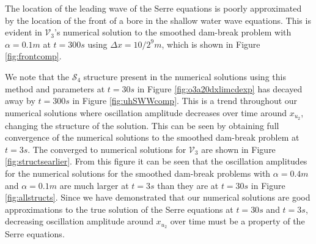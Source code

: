\documentclass[times]{elsarticle}
\begin{document}
The location of the leading wave of the Serre equations is poorly approximated by the location of the front of a bore in the shallow water wave equations. This is evident in $\mathcal{V}_3$'s numerical solution to the smoothed dam-break problem with $\alpha =0.1m$ at $t=300s$ using $\Delta x = 10/2^{9}m$, which is shown in Figure \ref{fig:frontcomp}.

We note that the $\mathcal{S}_4$ structure present in the numerical solutions using this method and parameters at $t=30s$ in Figure \ref{fig:o3a20dxlimcdexp} has decayed away by $t=300s$ in Figure \ref{fig:uhSWWcomp}. This is a trend throughout our numerical solutions where oscillation amplitude decreases over time around $x_{u_2}$, changing the structure of the solution. This can be seen by obtaining full convergence of the numerical solutions to the smoothed dam-break problem at $t=3s$. The converged to numerical solutions for $\mathcal{V}_3$ are shown in Figure \ref{fig:structsearlier}. From this figure it can be seen that the oscillation amplitudes for the numerical solutions for the smoothed dam-break problems with $\alpha = 0.4m$ and $\alpha = 0.1m$ are much larger at $t=3s$ than they are at $t=30s$ in Figure \ref{fig:allstructs}. Since we have demonstrated that our numerical solutions are good approximations to the true solution of the Serre equations at $t=30s$ and $t=3s$, decreasing oscillation amplitude around $x_{u_2}$ over time must be a property of the Serre equations.
 
\end{document}
